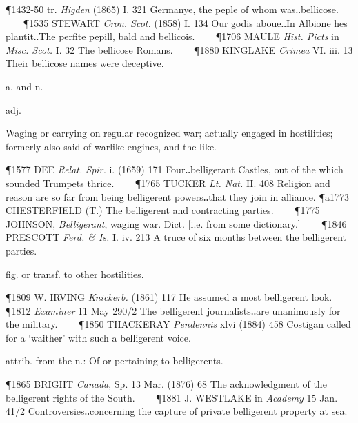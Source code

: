 \begin{description}[wide, labelwidth=!, labelindent=0pt]
\P 1432-50 tr. \textit{Higden} (1865) I. 321 Germanye, the peple of whom was‥bellicose.    
\P 1535 STEWART  \textit{Cron. Scot.} (1858) I. 134 Our godis aboue‥In Albione hes plantit‥The perfite pepill, bald and bellicois.    
\P 1706 MAULE  \textit{Hist. Picts} in \textit{Misc. Scot.} I. 32 The bellicose Romans.    
\P 1880 KINGLAKE  \textit{Crimea} VI. iii. 13 Their bellicose names were deceptive.


 a. and n.

\noindent {}

\vspace{-0.3cm}

\begin{myenumerate}

 adj.

 Waging or carrying on regular recognized war; actually engaged in hostilities; formerly also said of warlike engines, and the like.

\P 1577 DEE  \textit{Relat. Spir.} i. (1659) 171 Four‥belligerant Castles, out of the which sounded Trumpets thrice.    
\P 1765 TUCKER  \textit{Lt. Nat.} II. 408 Religion and reason are so far from being belligerent powers‥that they join in alliance.
\P a1773 CHESTERFIELD  (T.) The belligerent and contracting parties.    
\P 1775 JOHNSON,  \textit{Belligerant}, waging war. Dict. [i.e. from some dictionary.]    
\P 1846 PRESCOTT  \textit{Ferd. \& Is.} I. iv. 213 A truce of six months between the belligerent parties.

 fig. or transf. to other hostilities.

\P 1809 W. IRVING  \textit{Knickerb.} (1861) 117 He assumed a most belligerent look.    
\P 1812 \textit{Examiner}  11 May 290/2 The belligerent journalists‥are unanimously for the military.    
\P 1850 THACKERAY  \textit{Pendennis} xlvi (1884) 458 Costigan called for a ‘waither’ with such a belligerent voice.

 attrib. from the n.: Of or pertaining to belligerents.

\P 1865 BRIGHT  \textit{Canada}, Sp. 13 Mar. (1876) 68 The acknowledgment of the belligerent rights of the South.    
\P 1881 J. WESTLAKE in \textit{Academy} 15 Jan. 41/2 Controversies‥concerning the capture of private belligerent property at sea.


\end{myenumerate}
\end{description}
